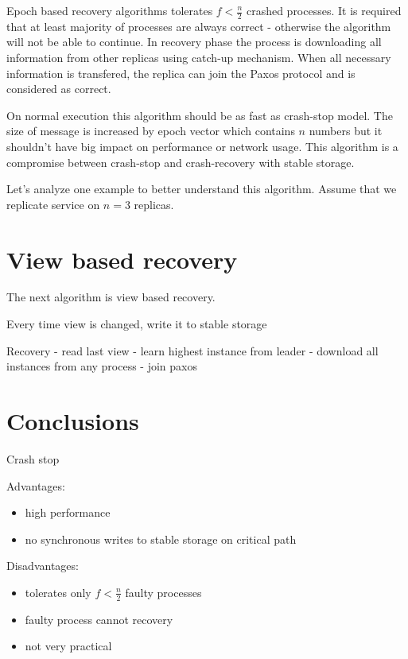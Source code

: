 Epoch based recovery algorithms tolerates $f < \frac{n}{2}$ crashed processes. It is required that at least majority of processes are always correct - otherwise the algorithm will not be able to continue. In recovery phase the process is downloading all information from other replicas using catch-up mechanism. When all necessary information is transfered, the replica can join the Paxos protocol and is considered as correct.

On normal execution this algorithm should be as fast as crash-stop model. The size of \prepareOK message is increased by epoch vector which contains $n$ numbers but it shouldn't have big impact on performance or network usage. This algorithm is a compromise between crash-stop and crash-recovery with stable storage.  

\begin{TODO}
Let's analyze one example to better understand this algorithm. Assume that we replicate service on $n = 3$ replicas.
\end{TODO}

\section{View based recovery}
\label{sec:view_ss}

The next algorithm is view based recovery.

\begin{TODO}
Every time view is changed, write it to stable storage

Recovery
- read last view
- learn highest instance from leader
- download all instances from any process
- join paxos
\end{TODO}


\section{Conclusions}

\begin{TODO}
Crash stop
\end{TODO}

Advantages:
\begin{itemize}
  \item high performance
  \item no synchronous writes to stable storage on critical path
\end{itemize}

Disadvantages:
\begin{itemize}
  \item tolerates only $f < \frac{n}{2}$ faulty processes
  \item faulty process cannot recovery 
  \item not very practical
\end{itemize}


